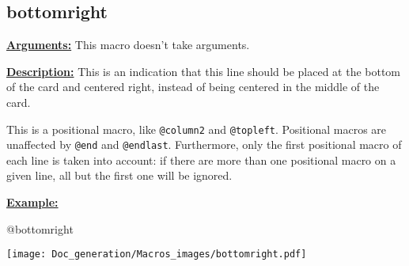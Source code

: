 \documentclass{article}
\begin{document}
\subsection{bottomright}
\textbf{\underline{Arguments:}} This macro doesn't take arguments.

\textbf{\underline{Description:}} This is an indication that this line should be placed at the bottom of the card and centered right, instead of being centered in the middle of the card.

This is a positional macro, like \verb`@column2` and \verb`@topleft`. Positional macros are unaffected by \verb`@end` and \verb`@endlast`. Furthermore, only the first positional macro of each line is taken into account: if there are more than one positional macro on a given line, all but the first one will be ignored.

\textbf{\underline{Example:}}

\begin{minipage}{0.45\linewidth}
\raggedright
\begin{spverbatim}
@bottomright 
\end{spverbatim}
\end{minipage}
\begin{minipage}{0.45\linewidth}
\raggedleft
\texttt{[image: Doc\_generation/Macros\_images/bottomright.pdf]}
\end{minipage} 
\end{document}
